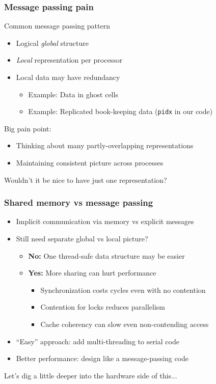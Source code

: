 \documentclass{beamer}
\begin{document}
\begin{frame}
  \titlepage
\end{frame}


\begin{frame}
  \frametitle{Message passing pain}

  Common message passing pattern
  \begin{itemize}
  \item Logical {\em global} structure
  \item {\em Local} representation per processor
  \item Local data may have redundancy
    \begin{itemize}
    \item Example: Data in ghost cells
    \item Example: Replicated book-keeping data ({\tt pidx} in our code)
    \end{itemize}
  \end{itemize}

  \vspace{5mm}
  Big pain point:
  \begin{itemize}
  \item Thinking about many partly-overlapping representations
  \item Maintaining consistent picture across processes
  \end{itemize}

  \vspace{5mm}
  Wouldn't it be nice to have just one representation?
\end{frame}

\begin{frame}
  \frametitle{Shared memory vs message passing}

  \begin{itemize}
  \item Implicit communication via memory vs explicit messages
  \item Still need separate global vs local picture?
    \begin{itemize}
    \item {\bf No:} One thread-safe data structure may be easier
    \item {\bf Yes:} More sharing can hurt performance
      \begin{itemize}
      \item Synchronization costs cycles even with no contention
      \item Contention for locks reduces parallelism
      \item Cache coherency can slow even non-contending access
      \end{itemize}
    \end{itemize}
  \item ``Easy'' approach: add multi-threading to serial code
  \item Better performance: design like a message-passing code
  \end{itemize}
  Let's dig a little deeper into the hardware side of this...
  
\end{frame}
\end{document}
